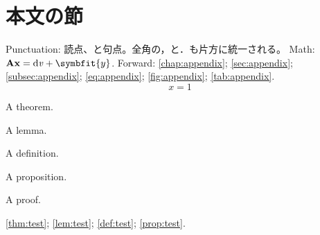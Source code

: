 \documentclass[11pt,a4paper,twoside,openany]{book}
\begin{document}
\section{本文の節}\label{sec:body}
Punctuation: 読点、と句点。全角の，と．も片方に統一される。
Math: $\mathbf{A}\mathbf{x} = \mathrm{d}\mathit{v} + \symbfit{y}$.
Forward: \cref{chap:appendix}; \cref{sec:appendix};
\cref{subsec:appendix}; \cref{eq:appendix};
\cref{fig:appendix}; \cref{tab:appendix}.
\begin{equation}\label{eq:body}x=1\end{equation}
\begin{theorem}\label{thm:test}A theorem.\end{theorem}
\begin{lemma}\label{lem:test}A lemma.\end{lemma}
\begin{definition}\label{def:test}A definition.\end{definition}
\begin{proposition}\label{prop:test}A proposition.\end{proposition}
\begin{proof*}A proof.\end{proof*}
\cref{thm:test}; \cref{lem:test}; \cref{def:test}; \cref{prop:test}.
\end{document}

